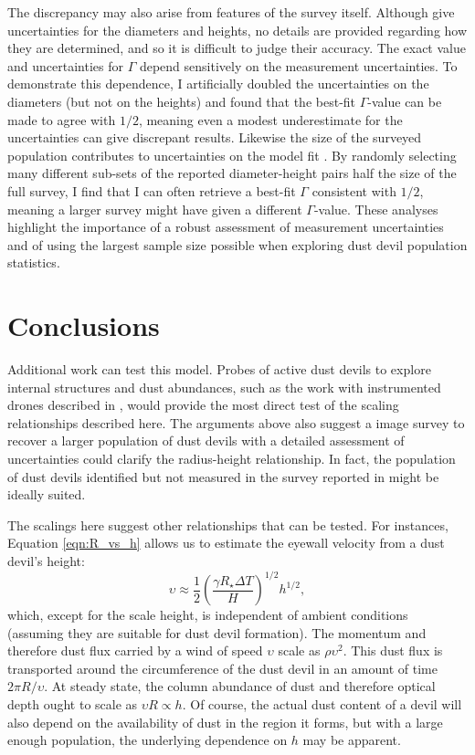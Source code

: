 \documentclass{aastex63}
\begin{document}
The discrepancy may also arise from features of the survey itself. Although \citet{2008Icar..197...39S} give uncertainties for the diameters and heights, no details are provided regarding how they are determined, and so it is difficult to judge their accuracy. The exact value and uncertainties for $\Gamma$ depend sensitively on the measurement uncertainties. To demonstrate this dependence, I artificially doubled the uncertainties on the diameters (but not on the heights) and found that the best-fit $\Gamma$-value can be made to agree with $1/2$, meaning even a modest underestimate for the uncertainties can give discrepant results. Likewise the size of the surveyed population contributes to uncertainties on the model fit \citep{2015JGRE..120..401J}. By randomly selecting many different sub-sets of the reported diameter-height pairs half the size of the full survey, I find that I can often retrieve a best-fit $\Gamma$ consistent with $1/2$, meaning a larger survey might have given a different $\Gamma$-value. These analyses highlight the importance of a robust assessment of measurement uncertainties and of using the largest sample size possible when exploring dust devil population statistics.

\section{Conclusions}
\label{sec:conclusions}
Additional work can test this model. Probes of active dust devils to explore internal structures and dust abundances, such as the work with instrumented drones described in \citet{2018RemS...10...65J}, would provide the most direct test of the scaling relationships described here. The arguments above also suggest a image survey to recover a larger population of dust devils with a detailed assessment of uncertainties could clarify the radius-height relationship. In fact, the population of dust devils identified but not measured in the survey reported in \citet{2006JGRE..11112002C} might be ideally suited.

The scalings here suggest other relationships that can be tested. For instances, Equation \ref{eqn:R_vs_h} allows us to estimate the eyewall velocity from a dust devil's height:
\begin{equation}
    \upsilon \approx \frac{1}{2} \left( \dfrac{\gamma R_\star \Delta T}{H} \right)^{1/2} h^{1/2},\label{eqn:velocity_vs_h}
\end{equation}
which, except for the scale height, is independent of ambient conditions (assuming they are suitable for dust devil formation). The momentum and therefore dust flux carried by a wind of speed $\upsilon$ scale as $\rho \upsilon^2$. This dust flux is transported around the circumference of the dust devil in an amount of time $2\pi R/\upsilon$. At steady state, the column abundance of dust and therefore optical depth ought to scale as $\upsilon R \propto h$. Of course, the actual dust content of a devil will also depend on the availability of dust in the region it forms, but with a large enough population, the underlying dependence on $h$ may be apparent. 
\end{document}
